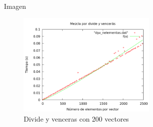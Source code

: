 \begin{frame}{Imagen}
	\begin{block}
	
	\begin{figure}[h] 
	\centering
	\includegraphics[width=0.6\textwidth]{../Obligatorio/Graficas/dyv_nelementos.png}
	\caption{Divide y venceras con 200 vectores} 
	\label{fig:d_nelementos} 
	\end{figure}
	
	\end{block}

\end{frame}